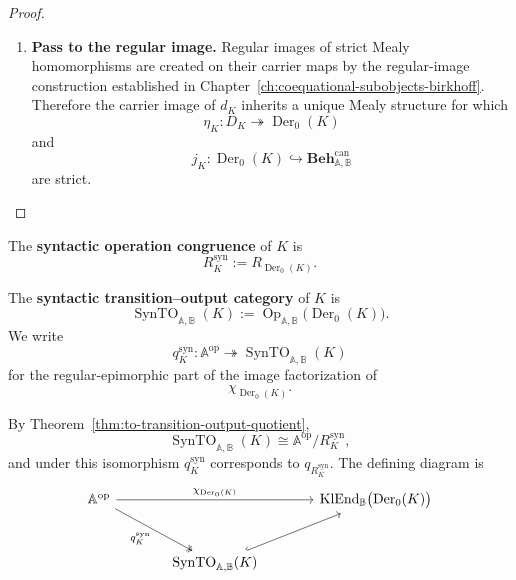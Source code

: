 \begin{proof}
\begin{enumerate}
        \item \textbf{Pass to the regular image.}
        Regular images of strict Mealy homomorphisms are created on their
        carrier maps by the regular-image construction established in
        Chapter~\ref{ch:coequational-subobjects-birkhoff}. Therefore the
        carrier image of \(d_K\) inherits a unique Mealy structure for which
        \[
            \eta_K:
            D_K\twoheadrightarrow\operatorname{Der}_0(K)
        \]
        and
        \[
            j_K:
            \operatorname{Der}_0(K)
            \hookrightarrow
            \mathbf{Beh}^{\mathrm{can}}_{\mathbb A,\mathbb B}
        \]
        are strict.
    \end{enumerate}
\end{proof}

\begin{definition}
\label{def:to-syntactic-operation-congruence}
    The \textbf{syntactic operation congruence} of \(K\) is
    \[
        R_K^{\mathrm{syn}}
        :=
        R_{\operatorname{Der}_0(K)}.
    \]
\end{definition}

\begin{definition}
\label{def:to-syntactic-transition-output-category}
    The \textbf{syntactic transition--output category} of \(K\) is
    \[
        \operatorname{SynTO}_{\mathbb A,\mathbb B}(K)
        :=
        \operatorname{Op}_{\mathbb A,\mathbb B}
        \bigl(\operatorname{Der}_0(K)\bigr).
    \]
    We write
    \[
        q_K^{\mathrm{syn}}:
        \mathbb A^{\mathrm{op}}
        \twoheadrightarrow
        \operatorname{SynTO}_{\mathbb A,\mathbb B}(K)
    \]
    for the regular-epimorphic part of the image factorization of
    \[
        \chi_{\operatorname{Der}_0(K)}.
    \]
\end{definition}

By Theorem~\ref{thm:to-transition-output-quotient},
\[
    \operatorname{SynTO}_{\mathbb A,\mathbb B}(K)
    \cong
    \mathbb A^{\mathrm{op}}/
    R_K^{\mathrm{syn}},
\]
and under this isomorphism \(q_K^{\mathrm{syn}}\) corresponds to
\(q_{R_K^{\mathrm{syn}}}\). The defining diagram is
\[
\begin{tikzcd}[column sep=large, row sep=large]
    \mathbb A^{\mathrm{op}}
        \arrow[rr,
        "\chi_{\operatorname{Der}_0(K)}"]
        \arrow[dr, two heads, "q_K^{\mathrm{syn}}"']
    &&
    \operatorname{KlEnd}_{\mathbb B}
    \bigl(\operatorname{Der}_0(K)\bigr)
    \\
    &
    \operatorname{SynTO}_{\mathbb A,\mathbb B}(K)
        \arrow[ur, hook]
    &
\end{tikzcd}
\]

